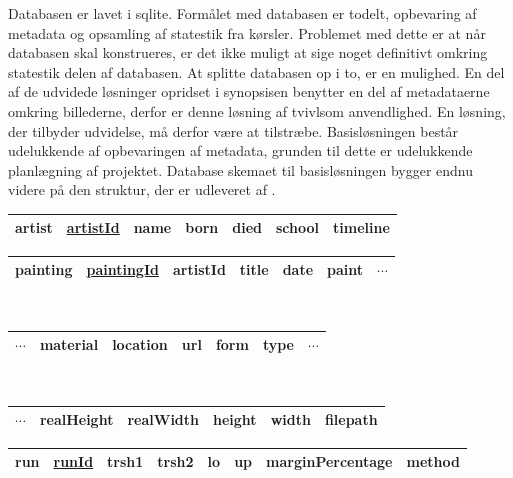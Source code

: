 Databasen er lavet i sqlite.  Formålet med databasen er todelt,
opbevaring af metadata og opsamling af statestik fra kørsler.
Problemet med dette er at når databasen skal konstrueres, er det ikke
muligt at sige noget definitivt omkring statestik delen af databasen.
At splitte databasen op i to, er en mulighed.  En del af de udvidede
løsninger opridset i synopsisen benytter en del af metadataerne omkring
billederne, derfor er denne løsning af tvivlsom anvendlighed.  En
løsning, der tilbyder udvidelse, må derfor være at tilstræbe.
Basisløsningen består udelukkende af opbevaringen af metadata, grunden
til dette er udelukkende planlægning af projektet.  Database skemaet
til basisløsningen bygger endnu videre på den struktur, der er
udleveret af \cite{wgahu}.

\begin{center}
\begin{tabular}{|l||c|c|c|c|c|c|}
    \hline
    \bf{artist} \hspace{0.5cm} & \underline{artistId} & name & born & died & school & timeline \\\hline
\end{tabular}

\begin{tabular}{|l||c|c|c|c|c|c}
    \hline
    \bf{painting} \hspace{0.5cm} & \underline{paintingId} & artistId & title & date & paint & $\cdots$ \\\hline
\end{tabular}\\ \vspace{0.2cm}\hspace{1.2cm}
\begin{tabular}{c|c|c|c|c|c|c}
    \hline
    $\cdots$ & material & location & url & form & type & $\cdots$ \\\hline
\end{tabular}\\ \vspace{0.2cm}\hspace{1.4cm}
\begin{tabular}{c|c|c|c|c|c|}
    \hline
    $\cdots$ & realHeight & realWidth & height & width & filepath \\\hline
\end{tabular}

\begin{tabular}{|l||c|c|c|c|c|c|c|}
    \hline
    \bf{run} \hspace{0.5cm} & \underline{runId} & trsh1 & trsh2 & lo & up & marginPercentage & method \\\hline
\end{tabular}


\end{center}
